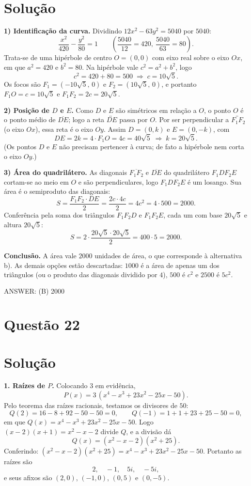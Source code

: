 \documentclass{article}%
\begin{document}
\section*{Solução}

\textbf{1) Identificação da curva.} Dividindo $12x^2-63y^2=5040$ por $5040$:
\[
\frac{x^2}{420}-\frac{y^2}{80}=1 \qquad\left(\frac{5040}{12}=420,\ \frac{5040}{63}=80\right).
\]
Trata-se de uma hipérbole de centro $O=(0,0)$ com eixo real sobre o eixo $Ox$, em que $a^2=420$ e $b^2=80$. Na hipérbole vale $c^2=a^2+b^2$, logo
\[
c^2=420+80=500 \;\Rightarrow\; c=10\sqrt{5}.
\]
Os focos são $F_1=(-10\sqrt5,\,0)$ e $F_2=(10\sqrt5,\,0)$, e portanto $F_1O=c=10\sqrt5$ e $F_1F_2=2c=20\sqrt5$.

\textbf{2) Posição de $D$ e $E$.} Como $D$ e $E$ são simétricos em relação a $O$, o ponto $O$ é o ponto médio de $\overline{DE}$; logo a reta $\overleftrightarrow{DE}$ passa por $O$. Por ser perpendicular a $\overleftrightarrow{F_1F_2}$ (o eixo $Ox$), essa reta é o eixo $Oy$. Assim $D=(0,k)$ e $E=(0,-k)$, com
\[
DE=2k=4\cdot F_1O=4c=40\sqrt5 \;\Rightarrow\; k=20\sqrt5 .
\]
(Os pontos $D$ e $E$ não precisam pertencer à curva; de fato a hipérbole nem corta o eixo $Oy$.)

\textbf{3) Área do quadrilátero.} As diagonais $\overline{F_1F_2}$ e $\overline{DE}$ do quadrilátero $F_1DF_2E$ cortam-se ao meio em $O$ e são perpendiculares, logo $F_1DF_2E$ é um losango. Sua área é o semiproduto das diagonais:
\[
S=\frac{F_1F_2\cdot DE}{2}=\frac{2c\cdot 4c}{2}=4c^2=4\cdot 500=2000 .
\]
Conferência pela soma dos triângulos $F_1F_2D$ e $F_1F_2E$, cada um com base $20\sqrt5$ e altura $20\sqrt5$:
\[
S=2\cdot\frac{20\sqrt5\cdot 20\sqrt5}{2}=400\cdot 5=2000.
\]

\textbf{Conclusão.} A área vale $2000$ unidades de área, o que corresponde à alternativa b). As demais opções estão descartadas: $1000$ é a área de apenas um dos triângulos (ou o produto das diagonais dividido por $4$), $500$ é $c^2$ e $2500$ é $5c^2$.

ANSWER: (B) 2000%
\newpage%
\section*{Questão 22}

\section*{Solução}

\textbf{1. Raízes de $P$.} Colocando 3 em evidência,
\[
P(x)=3\,(x^4-x^3+23x^2-25x-50).
\]
Pelo teorema das raízes racionais, testamos os divisores de $50$:
\[
Q(2)=16-8+92-50-50=0,\qquad Q(-1)=1+1+23+25-50=0,
\]
em que $Q(x)=x^4-x^3+23x^2-25x-50$. Logo $(x-2)(x+1)=x^2-x-2$ divide $Q$, e a divisão dá
\[
Q(x)=(x^2-x-2)(x^2+25).
\]
Conferindo: $(x^2-x-2)(x^2+25)=x^4-x^3+23x^2-25x-50$. Portanto as raízes são
\[
2,\quad -1,\quad 5i,\quad -5i,
\]
e seus afixos são $(2,0)$, $(-1,0)$, $(0,5)$ e $(0,-5)$.
\end{document}
